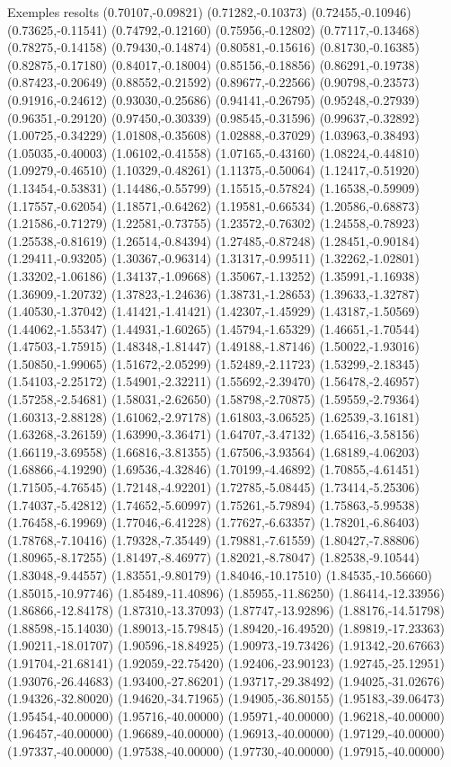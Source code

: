 \documentclass[11pt,a4paper]{article}
\begin{document}
\begin{fmex}{Exemples resolts}
(0.70107,-0.09821) (0.71282,-0.10373) (0.72455,-0.10946) (0.73625,-0.11541) (0.74792,-0.12160) (0.75956,-0.12802) (0.77117,-0.13468) (0.78275,-0.14158) (0.79430,-0.14874) (0.80581,-0.15616) (0.81730,-0.16385) (0.82875,-0.17180) (0.84017,-0.18004) (0.85156,-0.18856) (0.86291,-0.19738) (0.87423,-0.20649) (0.88552,-0.21592) (0.89677,-0.22566) (0.90798,-0.23573) (0.91916,-0.24612) (0.93030,-0.25686) (0.94141,-0.26795) (0.95248,-0.27939) (0.96351,-0.29120) (0.97450,-0.30339) (0.98545,-0.31596) (0.99637,-0.32892) (1.00725,-0.34229) (1.01808,-0.35608) (1.02888,-0.37029) (1.03963,-0.38493) (1.05035,-0.40003) (1.06102,-0.41558) (1.07165,-0.43160) (1.08224,-0.44810) (1.09279,-0.46510) (1.10329,-0.48261) (1.11375,-0.50064) (1.12417,-0.51920) (1.13454,-0.53831) (1.14486,-0.55799) (1.15515,-0.57824) (1.16538,-0.59909) (1.17557,-0.62054) (1.18571,-0.64262) (1.19581,-0.66534) (1.20586,-0.68873) (1.21586,-0.71279) (1.22581,-0.73755) (1.23572,-0.76302) (1.24558,-0.78923) (1.25538,-0.81619) (1.26514,-0.84394) (1.27485,-0.87248) (1.28451,-0.90184) (1.29411,-0.93205) (1.30367,-0.96314) (1.31317,-0.99511) (1.32262,-1.02801) (1.33202,-1.06186) (1.34137,-1.09668) (1.35067,-1.13252) (1.35991,-1.16938) (1.36909,-1.20732) (1.37823,-1.24636) (1.38731,-1.28653) (1.39633,-1.32787) (1.40530,-1.37042) (1.41421,-1.41421) (1.42307,-1.45929) (1.43187,-1.50569) (1.44062,-1.55347) (1.44931,-1.60265) (1.45794,-1.65329) (1.46651,-1.70544) (1.47503,-1.75915) (1.48348,-1.81447) (1.49188,-1.87146) (1.50022,-1.93016) (1.50850,-1.99065) (1.51672,-2.05299) (1.52489,-2.11723) (1.53299,-2.18345) (1.54103,-2.25172) (1.54901,-2.32211) (1.55692,-2.39470) (1.56478,-2.46957) (1.57258,-2.54681) (1.58031,-2.62650) (1.58798,-2.70875) (1.59559,-2.79364) (1.60313,-2.88128) (1.61062,-2.97178) (1.61803,-3.06525) (1.62539,-3.16181) (1.63268,-3.26159) (1.63990,-3.36471) (1.64707,-3.47132) (1.65416,-3.58156) (1.66119,-3.69558) (1.66816,-3.81355) (1.67506,-3.93564) (1.68189,-4.06203) (1.68866,-4.19290) (1.69536,-4.32846) (1.70199,-4.46892) (1.70855,-4.61451) (1.71505,-4.76545) (1.72148,-4.92201) (1.72785,-5.08445) (1.73414,-5.25306) (1.74037,-5.42812) (1.74652,-5.60997) (1.75261,-5.79894) (1.75863,-5.99538) (1.76458,-6.19969) (1.77046,-6.41228) (1.77627,-6.63357) (1.78201,-6.86403) (1.78768,-7.10416) (1.79328,-7.35449) (1.79881,-7.61559) (1.80427,-7.88806) (1.80965,-8.17255) (1.81497,-8.46977) (1.82021,-8.78047) (1.82538,-9.10544) (1.83048,-9.44557) (1.83551,-9.80179) (1.84046,-10.17510) (1.84535,-10.56660) (1.85015,-10.97746) (1.85489,-11.40896) (1.85955,-11.86250) (1.86414,-12.33956) (1.86866,-12.84178) (1.87310,-13.37093) (1.87747,-13.92896) (1.88176,-14.51798) (1.88598,-15.14030) (1.89013,-15.79845) (1.89420,-16.49520) (1.89819,-17.23363) (1.90211,-18.01707) (1.90596,-18.84925) (1.90973,-19.73426) (1.91342,-20.67663) (1.91704,-21.68141) (1.92059,-22.75420) (1.92406,-23.90123) (1.92745,-25.12951) (1.93076,-26.44683) (1.93400,-27.86201) (1.93717,-29.38492) (1.94025,-31.02676) (1.94326,-32.80020) (1.94620,-34.71965) (1.94905,-36.80155) (1.95183,-39.06473) (1.95454,-40.00000) (1.95716,-40.00000) (1.95971,-40.00000) (1.96218,-40.00000) (1.96457,-40.00000) (1.96689,-40.00000) (1.96913,-40.00000) (1.97129,-40.00000) (1.97337,-40.00000) (1.97538,-40.00000) (1.97730,-40.00000) (1.97915,-40.00000) 
\end{fmex}
\end{document}
